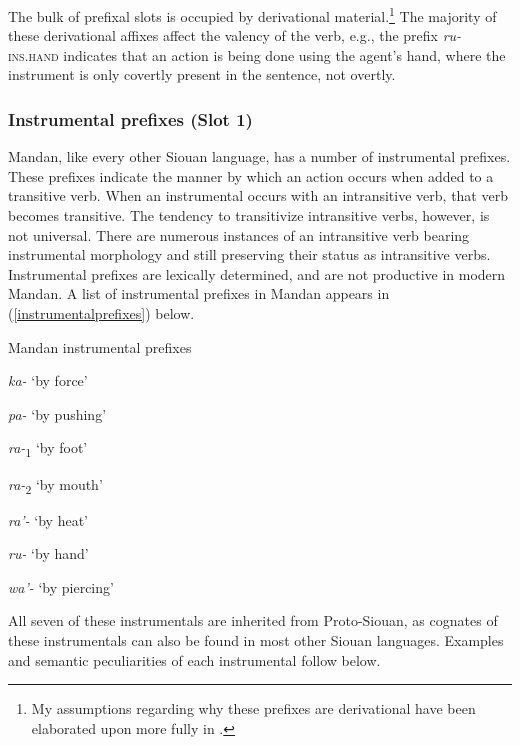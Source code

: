 The bulk of prefixal slots is occupied by derivational material.\footnote{My assumptions regarding why these prefixes are derivational have been elaborated upon more fully in \citet[5\textit{ff}]{kasak2019}.} The majority of these derivational affixes affect the valency of the verb, e.g., the prefix \textit{ru-} \textsc{ins.hand} indicates that an action is being done using the agent's hand, where the instrument is only covertly present in the sentence, not overtly.

\subsubsection{Instrumental prefixes (Slot 1)}\label{SubsubsecInstrumentalPrefixes}

Mandan, like every other Siouan language, has a number of instrumental prefixes. These prefixes indicate the manner by which an action occurs when added to a transitive verb. When an instrumental occurs with an intransitive verb, that verb becomes transitive. The tendency to transitivize intransitive verbs, however, is not universal. There are numerous instances of an intransitive verb bearing instrumental morphology and still preserving their status as intransitive verbs. Instrumental prefixes are lexically determined, and are not productive in modern Mandan. A list of instrumental prefixes in Mandan appears in (\ref{instrumentalprefixes}) below.

\begin{exe}
\item\label{instrumentalprefixes} Mandan instrumental prefixes

    \begin{xlist}
	\item	\textit{ka-}	`by force'
	\item 	\textit{pa-}	`by pushing'
	\item	\textit{ra-}\textsubscript{1}	`by foot'
	\item	\textit{ra-}\textsubscript{2}	`by mouth'
	\item	\textit{ra'-}	`by heat'
	\item	\textit{ru-}	`by hand'
	\item	\textit{wa'-}	`by piercing'
    \end{xlist}
\end{exe}

All seven of these instrumentals are inherited from Proto-Siouan, as cognates of these instrumentals can also be found in most other Siouan languages. Examples and semantic peculiarities of each instrumental follow below.%


